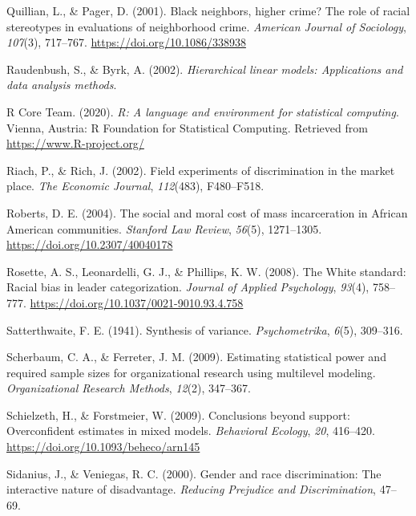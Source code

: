 \documentclass[
  english,
  man, noextraspace,floatsintext]{apa6}
\newlength{\cslhangindent}
\newenvironment{cslreferences}%
  {\setlength{\parindent}{0pt}%
  \everypar{\setlength{\hangindent}{\cslhangindent}}\ignorespaces}%
  {\par}
\begin{document}
\begin{cslreferences}
\leavevmode\hypertarget{ref-Quillian2001}{}%
Quillian, L., \& Pager, D. (2001). Black neighbors, higher crime? The role of racial stereotypes in evaluations of neighborhood crime. \emph{American Journal of Sociology}, \emph{107}(3), 717--767. \url{https://doi.org/10.1086/338938}

\leavevmode\hypertarget{ref-Raudenbush2002}{}%
Raudenbush, S., \& Byrk, A. (2002). \emph{Hierarchical linear models: Applications and data analysis methods}.

\leavevmode\hypertarget{ref-R-base}{}%
R Core Team. (2020). \emph{R: A language and environment for statistical computing}. Vienna, Austria: R Foundation for Statistical Computing. Retrieved from \url{https://www.R-project.org/}

\leavevmode\hypertarget{ref-Riach2002}{}%
Riach, P., \& Rich, J. (2002). Field experiments of discrimination in the market place. \emph{The Economic Journal}, \emph{112}(483), F480--F518.

\leavevmode\hypertarget{ref-Roberts2004}{}%
Roberts, D. E. (2004). The social and moral cost of mass incarceration in African American communities. \emph{Stanford Law Review}, \emph{56}(5), 1271--1305. \url{https://doi.org/10.2307/40040178}

\leavevmode\hypertarget{ref-Rosette2008}{}%
Rosette, A. S., Leonardelli, G. J., \& Phillips, K. W. (2008). The White standard: Racial bias in leader categorization. \emph{Journal of Applied Psychology}, \emph{93}(4), 758--777. \url{https://doi.org/10.1037/0021-9010.93.4.758}

\leavevmode\hypertarget{ref-Satterthwaite1941}{}%
Satterthwaite, F. E. (1941). Synthesis of variance. \emph{Psychometrika}, \emph{6}(5), 309--316.

\leavevmode\hypertarget{ref-Scherbaum2009}{}%
Scherbaum, C. A., \& Ferreter, J. M. (2009). Estimating statistical power and required sample sizes for organizational research using multilevel modeling. \emph{Organizational Research Methods}, \emph{12}(2), 347--367.

\leavevmode\hypertarget{ref-Schielzeth2009}{}%
Schielzeth, H., \& Forstmeier, W. (2009). Conclusions beyond support: Overconfident estimates in mixed models. \emph{Behavioral Ecology}, \emph{20}, 416--420. \url{https://doi.org/10.1093/beheco/arn145}

\leavevmode\hypertarget{ref-Sidanius2000}{}%
Sidanius, J., \& Veniegas, R. C. (2000). Gender and race discrimination: The interactive nature of disadvantage. \emph{Reducing Prejudice and Discrimination}, 47--69.


\end{cslreferences}
\end{document}
